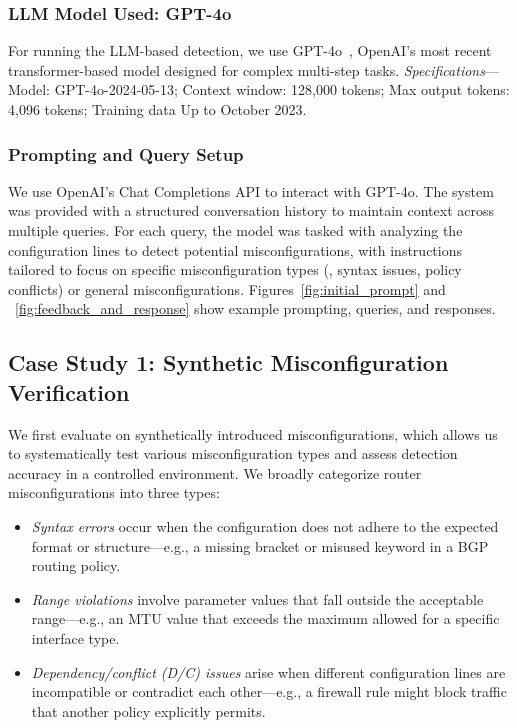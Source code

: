 \subsubsection{LLM Model Used: GPT-4o} For running the LLM-based detection, we use GPT-4o~\cite{openai_gpt4o}, OpenAI's most recent transformer-based model designed for complex multi-step tasks.
\textit{Specifications}---Model: GPT-4o-2024-05-13; Context window: 128,000 tokens; Max output tokens: 4,096 tokens; Training data Up to October 2023.

\subsubsection{Prompting and Query Setup}
We use OpenAI’s Chat Completions API to interact with GPT-4o. The system was provided with a structured conversation history to maintain context across multiple queries. For each query, the model was tasked with analyzing the configuration lines to detect potential misconfigurations, with instructions tailored to focus on specific misconfiguration types (\eg, syntax issues, policy conflicts) or general misconfigurations. Figures~\ref{fig:initial_prompt} and ~\ref{fig:feedback_and_response}
show example prompting, queries, and responses.

\subsection{Case Study 1: Synthetic Misconfiguration Verification}
We first evaluate \sysname{} on synthetically introduced misconfigurations, which allows us to systematically test various misconfiguration types and assess detection accuracy in a controlled environment.
We broadly categorize router misconfigurations into three types:
\begin{itemize}
    \item \textit{Syntax errors} occur when the configuration does not adhere to the expected format or structure---e.g., a missing bracket or misused keyword in a BGP routing policy.
    \item \textit{Range violations} involve parameter values that fall outside the acceptable range---e.g., an MTU value that exceeds the maximum allowed for a specific interface type.
    \item \textit{Dependency/conflict (D/C) issues} arise when different configuration lines are incompatible or contradict each other---e.g., a firewall rule might block traffic that another policy explicitly permits.
\end{itemize}


